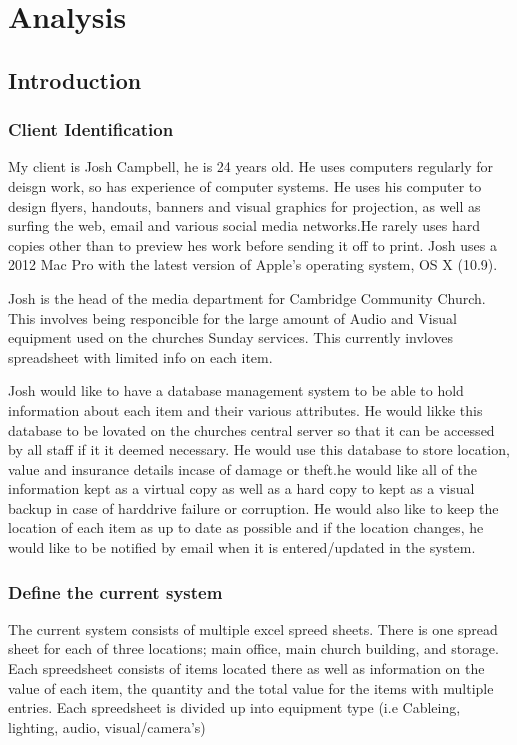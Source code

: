 \documentclass[a4paper,12pt]{report}
\begin{document}
\chapter{Analysis}

\section{Introduction}

\subsection{Client Identification}

My client is Josh Campbell, he is 24 years old. He uses computers regularly for deisgn work, so has experience of computer systems. He uses his computer to design flyers, handouts, banners and visual graphics for projection, as well as surfing the web, email and various social media networks.He rarely uses hard copies other than to preview hes work before sending it off to print. Josh uses a 2012 Mac Pro with the latest version of Apple's operating system, OS X (10.9).

Josh is the head of the media department for Cambridge Community Church. This involves being responcible for the large amount of Audio and Visual equipment used on the churches Sunday services. This currently invloves spreadsheet with limited info on each item. 

Josh would like to have a database management system to be able to hold information about each item and their various attributes. He would likke this database to be lovated on the churches central server so that it can be accessed by all staff if it it deemed necessary. He would use this database to store location, value and insurance details incase of damage or theft.he would like all of the information kept as a virtual copy as well as a hard copy to kept as a visual backup in case of harddrive failure or corruption. He would also like to keep the location of each item as up to date as possible and if the location changes, he would like to be notified by email when it is entered/updated in the system.

\subsection{Define the current system}

The current system consists of multiple excel spreed sheets. There is one spread sheet for each of three locations; main office, main church building, and storage. Each spreedsheet consists of items located there as well as information on the value of each item, the quantity and the total value for the items with multiple entries. Each spreedsheet is divided up into equipment type (i.e Cableing, lighting, audio, visual/camera's) 
\end{document}
